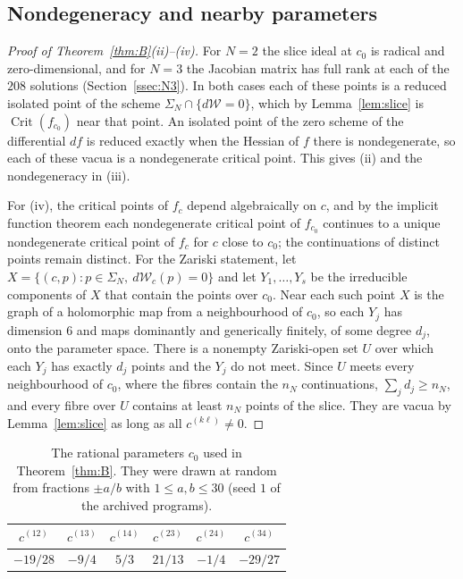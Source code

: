 \documentclass[11pt]{amsart}
\theoremstyle{definition}
\newcommand{\Crit}{\operatorname{Crit}}
\newcommand{\cW}{\mathcal W}
\begin{document}
\subsection{Nondegeneracy and nearby parameters}\label{ssec:nondeg}
\begin{proof}[Proof of Theorem~\ref{thm:B}(ii)--(iv)]
For $N=2$ the slice ideal at $c_0$ is radical and zero-dimensional, and for $N=3$ the Jacobian matrix has full rank at each of the $208$ solutions (Section~\ref{ssec:N3}). In both cases each of these points is a reduced isolated point of the scheme $\Sigma_N\cap\{d\cW=0\}$, which by Lemma~\ref{lem:slice} is $\Crit(f_{c_0})$ near that point. An isolated point of the zero scheme of the differential $df$ is reduced exactly when the Hessian of $f$ there is nondegenerate, so each of these vacua is a nondegenerate critical point. This gives (ii) and the nondegeneracy in (iii).

For (iv), the critical points of $f_c$ depend algebraically on $c$, and by the implicit function theorem each nondegenerate critical point of $f_{c_0}$ continues to a unique nondegenerate critical point of $f_c$ for $c$ close to $c_0$; the continuations of distinct points remain distinct. For the Zariski statement, let $X=\{(c,p):p\in\Sigma_N,\ d\cW_c(p)=0\}$ and let $Y_1,\dots,Y_s$ be the irreducible components of $X$ that contain the points over $c_0$. Near each such point $X$ is the graph of a holomorphic map from a neighbourhood of $c_0$, so each $Y_j$ has dimension $6$ and maps dominantly and generically finitely, of some degree $d_j$, onto the parameter space. There is a nonempty Zariski-open set $U$ over which each $Y_j$ has exactly $d_j$ points and the $Y_j$ do not meet. Since $U$ meets every neighbourhood of $c_0$, where the fibres contain the $n_N$ continuations, $\sum_jd_j\ge n_N$, and every fibre over $U$ contains at least $n_N$ points of the slice. They are vacua by Lemma~\ref{lem:slice} as long as all $c^{(k\ell)}\ne0$.
\end{proof}

\begin{table}[t]
\centering
\caption{The rational parameters $c_0$ used in Theorem~\ref{thm:B}. They were drawn at random from fractions $\pm a/b$ with $1\le a,b\le30$ (seed $1$ of the archived programs).}
\label{tab:c0}
\begin{tabular}{cccccc}
\toprule
$c^{(12)}$ & $c^{(13)}$ & $c^{(14)}$ & $c^{(23)}$ & $c^{(24)}$ & $c^{(34)}$\\
\midrule
$-19/28$ & $-9/4$ & $5/3$ & $21/13$ & $-1/4$ & $-29/27$\\
\bottomrule
\end{tabular}
\end{table}
\end{document}
